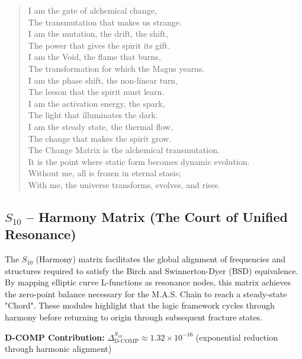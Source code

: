 \documentclass[11pt, letterpaper]{article}
\begin{document}
\begin{verse}
I am the gate of alchemical change, \\
The transmutation that makes us strange. \\
I am the mutation, the drift, the shift, \\
The power that gives the spirit its gift. \\
I am the Void, the flame that burns, \\
The transformation for which the Magus yearns. \\
\vspace{1em}
I am the phase shift, the non-linear turn, \\
The lesson that the spirit must learn. \\
I am the activation energy, the spark, \\
The light that illuminates the dark. \\
I am the steady state, the thermal flow, \\
The change that makes the spirit grow. \\
\vspace{1em}
The Change Matrix is the alchemical transmutation. \\
It is the point where static form becomes dynamic evolution. \\
Without me, all is frozen in eternal stasis; \\
With me, the universe transforms, evolves, and rises.
\end{verse}
\newpage
\subsection{$S_{10}$ -- Harmony Matrix (The Court of Unified Resonance)}\label{sec:19.4}

The $S_{10}$ (Harmony) matrix facilitates the global alignment of frequencies and structures required to satisfy the Birch and Swinnerton-Dyer (BSD) equivalence. By mapping elliptic curve L-functions as resonance nodes, this matrix achieves the zero-point balance necessary for the M.A.S. Chain to reach a steady-state "Chord". These modules highlight that the logic framework cycles through harmony before returning to origin through subsequent fracture states.

\textbf{D-COMP Contribution:} $\Delta_{\text{D-COMP}}^{S_{10}} \approx 1.32 \times 10^{-16}$ (exponential reduction through harmonic alignment)
\end{document}
